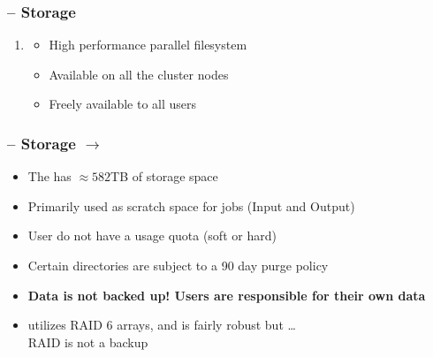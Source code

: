 \begin{frame}
	\frametitle{{\craycs} -- Storage}
	\begin{enumerate}
		\item {\lustre}
                  \begin{itemize}
                  \item High performance parallel filesystem 
                  \item Available on all the cluster nodes
                    \item Freely available to all users
                  \end{itemize}
	\end{enumerate}
\end{frame}

\begin{frame}
	\frametitle{{\craycs} -- Storage $\rightarrow$ {\lustre}}
	\begin{itemize}
		\item The {\craycs} has $\approx582$TB of storage space

		\item Primarily used as scratch space for jobs (Input and Output)
		\item User do not have a usage quota (soft or hard)
		\item Certain directories are subject to a 90 day purge policy
		\item \textbf{Data is not backed up!  Users are responsible for their own data}
                \item {\lustre} utilizes RAID 6 arrays, and is fairly robust but \ldots~\\RAID is not a backup
	\end{itemize}
\end{frame}

